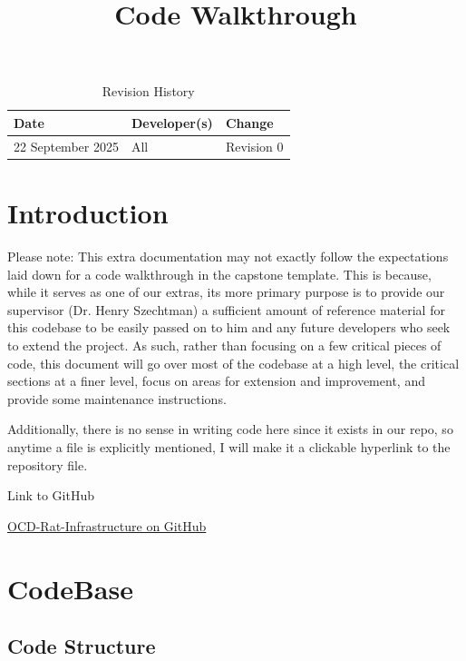 \documentclass{article}
\title{Code Walkthrough\\\progname}
\begin{document}
\maketitle
\tableofcontents
\newpage

\begin{table}[hp]
\caption{Revision History} \label{TblRevisionHistory}
\begin{tabularx}{\textwidth}{llX}
\toprule
\textbf{Date} & \textbf{Developer(s)} & \textbf{Change}\\
\midrule
22 September 2025& All & Revision 0\\
\bottomrule
\end{tabularx}
\end{table}

\section{Introduction}

\par{Please note: This extra documentation may not exactly follow the expectations laid down for a code walkthrough in the capstone template. 
This is because, while it serves as one of our extras, its more primary purpose is to provide our supervisor (Dr. Henry Szechtman) a sufficient 
amount of reference material for this codebase to be easily passed on to him and any future developers who seek to extend the project. As such, rather 
than focusing on a few critical pieces of code, this document will go over most of the codebase at a high level, the critical sections at a finer level, 
focus on areas for extension and improvement, and provide some maintenance instructions.}

\par{Additionally, there is no sense in writing code here since it exists in our repo, so anytime a file is explicitly mentioned, I will make it a clickable hyperlink to the repository file.}

\par{Link to GitHub}
\par{\href{https://github.com/OCD-Rats-Capstone/OCD-Rat-Infrastructure}{OCD-Rat-Infrastructure on GitHub}}

\section{CodeBase}

\subsection{Code Structure}
\end{document}
